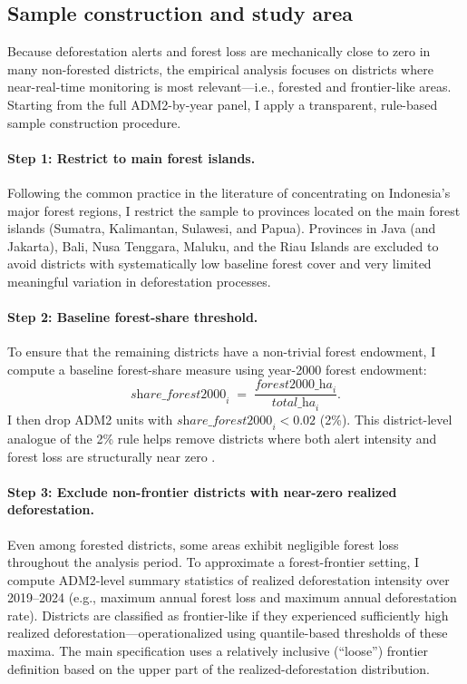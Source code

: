 \documentclass[hidelinks,12pt]{article}
\begin{document}
\subsection{Sample construction and study area}

Because deforestation alerts and forest loss are mechanically close to zero in many non-forested districts, the empirical analysis focuses on districts where near-real-time monitoring is most relevant—i.e., forested and frontier-like areas. Starting from the full ADM2-by-year panel, I apply a transparent, rule-based sample construction procedure.

\paragraph{Step 1: Restrict to main forest islands.}
Following the common practice in the literature of concentrating on Indonesia's major forest regions, I restrict the sample to provinces located on the main forest islands (Sumatra, Kalimantan, Sulawesi, and Papua). Provinces in Java (and Jakarta), Bali, Nusa Tenggara, Maluku, and the Riau Islands are excluded to avoid districts with systematically low baseline forest cover and very limited meaningful variation in deforestation processes.

\paragraph{Step 2: Baseline forest-share threshold.}
To ensure that the remaining districts have a non-trivial forest endowment, I compute a baseline forest-share measure using year-2000 forest endowment:
\[
\textit{share\_forest2000}_{i} \;=\; \frac{\textit{forest2000\_ha}_{i}}{\textit{total\_ha}_{i}}.
\]
I then drop ADM2 units with $\textit{share\_forest2000}_{i} < 0.02$ (2\%). This district-level analogue of the 2\% rule helps remove districts where both alert intensity and forest loss are structurally near zero \citep{hansen2013gfc}.

\paragraph{Step 3: Exclude non-frontier districts with near-zero realized deforestation.}
Even among forested districts, some areas exhibit negligible forest loss throughout the analysis period. To approximate a forest-frontier setting, I compute ADM2-level summary statistics of realized deforestation intensity over 2019--2024 (e.g., maximum annual forest loss and maximum annual deforestation rate). Districts are classified as frontier-like if they experienced sufficiently high realized deforestation—operationalized using quantile-based thresholds of these maxima. The main specification uses a relatively inclusive (``loose'') frontier definition based on the upper part of the realized-deforestation distribution.
\end{document}
